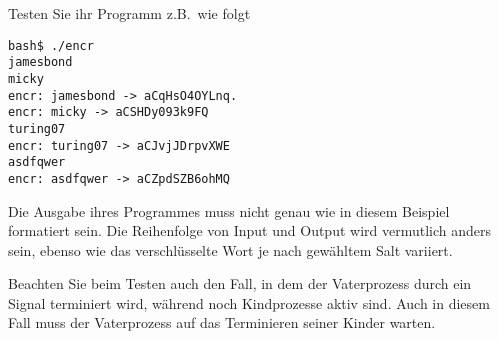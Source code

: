 Testen Sie ihr Programm z.B.\ wie folgt
\begin{verbatim}
bash$ ./encr
jamesbond
micky
encr: jamesbond -> aCqHsO4OYLnq.
encr: micky -> aCSHDy093k9FQ
turing07
encr: turing07 -> aCJvjJDrpvXWE
asdfqwer
encr: asdfqwer -> aCZpdSZB6ohMQ
\end{verbatim}

Die Ausgabe ihres Programmes muss nicht genau wie in diesem Beispiel
formatiert sein. Die Reihenfolge von Input und Output wird vermutlich
anders sein, ebenso wie das verschlüsselte Wort je nach gewähltem Salt
variiert.

Beachten Sie beim Testen auch den Fall, in dem der Vaterprozess durch
ein Signal terminiert wird, während noch Kindprozesse aktiv sind. Auch
in diesem Fall muss der Vaterprozess auf das Terminieren seiner Kinder
warten.

\osueguidelinestwo


